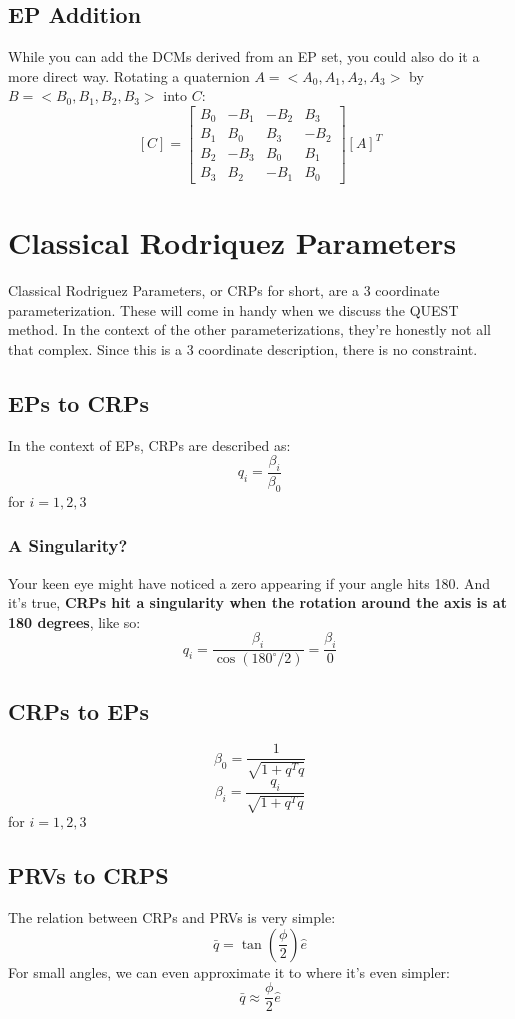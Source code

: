 \documentclass[a4paper,14pt]{extreport}
\begin{document}
\section{EP Addition}
While you can add the DCMs derived from an EP set, you could also do it a more direct way. Rotating a quaternion \(A = <A_0,A_1,A_2,A_3>\) by \(B = <B_0,B_1,B_2,B_3>\) into \(C\):
\[
[C] = 
\begin{bmatrix}
B_0&-B_1&-B_2&B_3\\
B_1&B_0&B_3&-B_2\\
B_2&-B_3&B_0&B_1\\
B_3&B_2&-B_1&B_0
\end{bmatrix}
[A]^T
\]
\chapter{Classical Rodriquez Parameters}
Classical Rodriguez Parameters, or CRPs for short, are a 3 coordinate parameterization. These will come in handy when we discuss the QUEST method. In the context of the other parameterizations, they're honestly not all that complex. Since this is a 3 coordinate description, there is no constraint.
\section{EPs to CRPs}
In the context of EPs, CRPs are described as:
\[
q_i = \dfrac{\beta_i}{\beta_0}
\]
for \(i=1,2,3\)
\subsection{A Singularity?}
Your keen eye might have noticed a zero appearing if your angle hits 180. And it's true, \textbf{CRPs hit a singularity when the rotation around the axis is at 180 degrees}, like so:
\[
q_i = \dfrac{\beta_i}{\cos(180^{\circ}/2)} = \dfrac{\beta_i}{0}
\]
\section{CRPs to EPs}
\[
\beta_0 = \dfrac{1}{\sqrt{1+q^Tq}}
\]
\[
\beta_i = \dfrac{q_i}{\sqrt{1+q^Tq}}
\]
for \(i=1,2,3\)
\section{PRVs to CRPS}
The relation between CRPs and PRVs is very simple:
\[
\bar{q} = \tan{(\dfrac{\phi}{2})}\hat{e}
\]
For small angles, we can even approximate it to where it's even simpler:
\[
\bar{q} \approx \dfrac{\phi}{2}\hat{e}
\]
\end{document}
